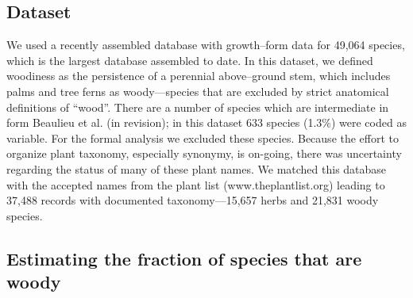 \documentclass[12pt]{article}
\begin{document}
\subsection{Dataset}

We used a recently assembled database with growth--form data for
49,064 species, which is the largest database assembled to date.  
% 
% 
In this dataset, we defined woodiness as the persistence of a
perennial above--ground stem, which includes palms and tree ferns as
woody---species that are excluded by strict anatomical definitions of
``wood''.  
There are a number of species which are intermediate in form Beaulieu
et al. (in revision); in this dataset 633 species (1.3\%) were coded
as variable.  For the formal analysis we excluded these species.
Because the effort to organize plant taxonomy, especially synonymy, is
on-going, there was uncertainty regarding the status of many of these
plant names.  We matched this database with the accepted names from
the plant list (www.theplantlist.org) leading to 37,488 records with documented
taxonomy---15,657 herbs and 21,831 woody species.



\subsection{Estimating the fraction of species that are woody}
\end{document}
